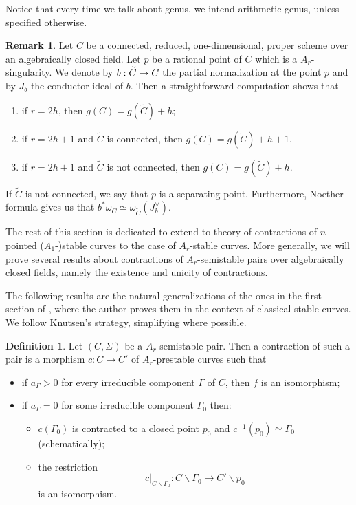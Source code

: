 \documentclass{alggeom}
\numberwithin{equation}{section}
\numberwithin{subsection}{section}
\theoremstyle{definition}
\newtheorem{definition}[theorem]{Definition}
\newtheorem{remark}[theorem]{Remark}
\theoremstyle{remark}
\newcommand\arr{\ifinner\to\else\longrightarrow\fi}
\renewcommand{\setminus}{\smallsetminus}
\begin{document}
Notice that every time we talk about genus, we intend arithmetic genus, unless specified otherwise.

\begin{remark}\label{rem:genus-count}
	Let $C$ be a connected, reduced, one-dimensional, proper scheme over an algebraically closed field. Let $p$ be a rational point of $C$ which is a $A_r$-singularity. We denote by $b:\widetilde{C}\arr C$ the partial normalization at the point $p$ and by $J_b$ the conductor ideal of $b$. Then a straightforward computation shows that \begin{enumerate}
		\item if $r=2h$, then $g(C)=g(\widetilde{C})+h$;
		\item if $r=2h+1$ and $\widetilde{C}$ is connected, then $g(C)=g(\widetilde{C})+h+1$,
		\item if $r=2h+1$ and $\widetilde{C}$ is not connected, then $g(C)=g(\widetilde{C})+h$.
	\end{enumerate}
	If $\widetilde{C}$ is not connected, we say that $p$ is a separating point. Furthermore, Noether formula gives us that $b^*\omega_C \simeq \omega_{\widetilde{C}}(J_b^{\vee})$.
\end{remark}

The rest of this section is dedicated to extend to theory of contractions of $n$-pointed ($A_1$-)stable curves to the case of $A_r$-stable curves. More generally, we will prove several results about contractions of $A_r$-semistable pairs over algebraically closed fields, namely the existence and unicity of contractions.

The following results are the natural generalizations of the ones in the first section of \cite{Knu}, where the author proves them in the context of classical stable curves. We follow Knutsen's strategy, simplifying where possible. 

\begin{definition}
 Let $(C,\Sigma)$ be a $A_r$-semistable pair. Then a contraction of such a pair is a morphism  $c:C \rightarrow C'$ of $A_r$-prestable curves such that 
 \begin{itemize}
  \item[(i)] if $a_{\Gamma}>0$ for every irreducible component $\Gamma$ of $C$, then $f$ is an isomorphism;
  \item[(ii)] if $a_{\Gamma}=0$ for some irreducible component $\Gamma_0$ then:
  \begin{itemize}
     \item[a)] $c(\Gamma_0)$ is contracted to a closed point $p_{0}$ and $c^{-1}(p_{0})\simeq \Gamma_0$ (schematically); 
     \item[b)]  the restriction
  $$ c\vert_{C\setminus \Gamma_0}: C\setminus \Gamma_0 \longrightarrow C' \setminus p_0$$ 
  is an isomorphism.
 \end{itemize}
  
 \end{itemize}

\end{definition}
\end{document}
